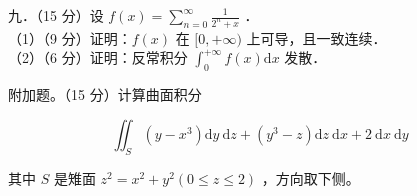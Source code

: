 \documentclass{article}
\begin{document}
九．（15 分）设 \(f(x)=\sum_{n=0}^{\infty} \frac{1}{2^{n}+x}\) ．\\
（1）（9 分）证明：\(f(x)\) 在 \([0,+\infty)\) 上可导，且一致连续．\\
（2）（6 分）证明：反常积分 \(\int_{0}^{+\infty} f(x) \mathrm{d} x\) 发散．

附加题。（15 分）计算曲面积分

\[
\iint_{S}\left(y-x^{3}\right) \mathrm{d} y \mathrm{~d} z+\left(y^{3}-z\right) \mathrm{d} z \mathrm{~d} x+2 \mathrm{~d} x \mathrm{~d} y
\]

其中 \(S\) 是雉面 \(z^{2}=x^{2}+y^{2}(0 \leq z \leq 2)\) ，方向取下侧。
\end{document}
